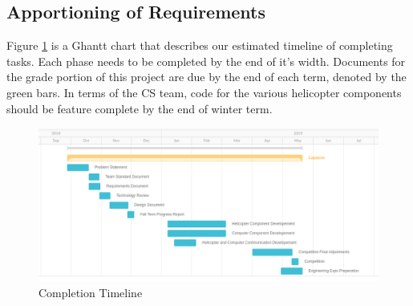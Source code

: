 \documentclass[onecolumn, oneside, letterpaper, draftclsnofoot, 10pt, compsoc]{IEEEtran}
\begin{document}
\subsection{Apportioning of Requirements}
Figure \ref{fig:GanttChart} is a Ghantt chart that describes our estimated timeline of completing tasks. Each phase needs to be completed by the end of it’s width. Documents for the grade portion of this project are due by the end of each term, denoted by the green bars. In terms of the CS team, code for the various helicopter components should be feature complete by the end of winter term.
\begin{figure}[h]
    \centering
    \includegraphics[width=1.0\textwidth]{graphics/gantt_chart.png}
    \caption{Completion Timeline}
    \label{fig:GanttChart}
\end{figure}
\end{document}
